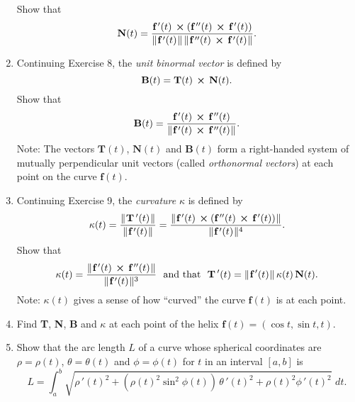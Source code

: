 \begin{enumerate}[\bfseries 1.]
\begin{displaymath}
  \end{displaymath}
  Show that
  \begin{displaymath}
   \textbf{N}(t) = \dfrac{\textbf{f}\,'(t)\, \bm{\times} (\textbf{f}\,''(t)\, \bm{\times} \,\textbf{f}\,'(t))}{
    \lVert\mspace{1mu}\textbf{f}\,'(t)\mspace{1mu}\rVert \,\lVert\mspace{1mu}\textbf{f}\,''(t)\, \bm{\times} \,\textbf{f}\,'(t)\mspace{1mu}\rVert} .
  \end{displaymath}
 \item Continuing Exercise 8, the \emph{unit binormal vector}  is defined by
  \begin{displaymath}
   \textbf{B}(t) = \textbf{T}(t)\, \bm{\times} \,\textbf{N}(t) .
  \end{displaymath}
  Show that
  \begin{displaymath}
   \textbf{B}(t) = \dfrac{\textbf{f}\,'(t)\, \bm{\times} \,\textbf{f}\,''(t)}{
    \lVert\mspace{1mu}\textbf{f}\,'(t)\, \bm{\times} \,\textbf{f}\,''(t)\mspace{1mu}\rVert} .
  \end{displaymath}
  Note: The vectors $\textbf{T}(t)$, $\textbf{N}(t)$ and $\textbf{B}(t)$ form a right-handed system of mutually
  perpendicular unit vectors (called \emph{orthonormal vectors}) at each point on the curve $\textbf{f}(t)$.
 \item Continuing Exercise 9, the \emph{curvature} $\kappa$  is defined by
  \begin{displaymath}
   \kappa(t) = \dfrac{\lVert\mspace{1mu}\textbf{T}\,'(t)\mspace{1mu}\rVert}{\lVert\mspace{1mu}\textbf{f}\,'(t)\mspace{1mu}\rVert} =
    \dfrac{\lVert\mspace{1mu}\textbf{f}\,'(t)\, \bm{\times} (\textbf{f}\,''(t)\, \bm{\times} \,\textbf{f}\,'(t))\mspace{1mu}\rVert}{
    \lVert\mspace{1mu}\textbf{f}\,'(t)\mspace{1mu}\rVert^4}.
  \end{displaymath}
  Show that
  \begin{displaymath}
   \kappa(t) = \dfrac{\lVert\mspace{1mu}\textbf{f}\,'(t)\, \bm{\times} \,\textbf{f}\,''(t)\mspace{1mu}\rVert}{\lVert\mspace{1mu}\textbf{f}\,'(t)\mspace{1mu}\rVert^3}
   \text{~~and that~~} \textbf{T}\,'(t) = \lVert\mspace{1mu}\textbf{f}\,'(t)\mspace{1mu}\rVert \,\kappa(t) \, \textbf{N}(t) .
  \end{displaymath}
  Note: $\kappa(t)$ gives a sense of how ``curved'' the curve $\textbf{f}(t)$ is at each point.
 \item Find \textbf{T}, \textbf{N}, \textbf{B} and $\kappa$ at each point of the helix
  $\textbf{f}(t) = (\cos t ,\sin t,t)$. 
 \item Show that the arc length $L$ of a curve whose spherical coordinates are $\rho = \rho(t)$, $\theta = \theta(t)$
  and $\phi = \phi(t)$ for $t$ in an interval $[a,b]$ is
  \begin{displaymath}
   L = \int_{a}^{b} \sqrt{\rho\,'(t)^2 + (\rho(t)^2 \sin^2 \phi(t))\,\theta\,'(t)^2 + \rho(t)^2 \phi\,'(t)^2}\,\, dt .
  \end{displaymath}
\end{enumerate}
